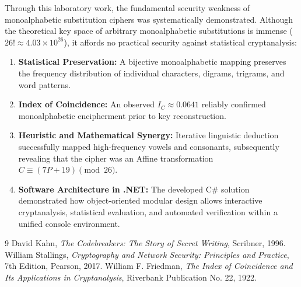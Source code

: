 \documentclass[12pt,a4paper]{article}
\begin{document}
Through this laboratory work, the fundamental security weakness of monoalphabetic substitution ciphers was systematically demonstrated. Although the theoretical key space of arbitrary monoalphabetic substitutions is immense ($26! \approx 4.03 \times 10^{26}$), it affords no practical security against statistical cryptanalysis:
\begin{enumerate}
    \item \textbf{Statistical Preservation:} A bijective monoalphabetic mapping preserves the frequency distribution of individual characters, digrams, trigrams, and word patterns.
    \item \textbf{Index of Coincidence:} An observed $I_C \approx 0.0641$ reliably confirmed monoalphabetic encipherment prior to key reconstruction.
    \item \textbf{Heuristic and Mathematical Synergy:} Iterative linguistic deduction successfully mapped high-frequency vowels and consonants, subsequently revealing that the cipher was an Affine transformation $C \equiv (7P + 19) \pmod{26}$.
    \item \textbf{Software Architecture in .NET:} The developed C\# solution demonstrated how object-oriented modular design allows interactive cryptanalysis, statistical evaluation, and automated verification within a unified console environment.
\end{enumerate}

\begin{thebibliography}{9}
David Kahn, \textit{The Codebreakers: The Story of Secret Writing}, Scribner, 1996.
William Stallings, \textit{Cryptography and Network Security: Principles and Practice}, 7th Edition, Pearson, 2017.
William F. Friedman, \textit{The Index of Coincidence and Its Applications in Cryptanalysis}, Riverbank Publication No. 22, 1922.
\end{thebibliography}
\end{document}
